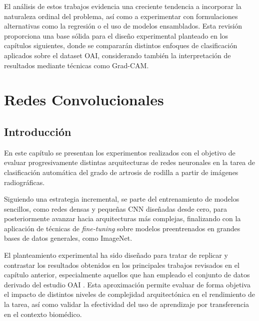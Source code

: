 \documentclass[11pt,spanish,listoffigures,listoftables]{tfgetsinf}
\begin{document}
El análisis de estos trabajos evidencia una creciente tendencia a incorporar la naturaleza ordinal del problema, así como a experimentar 
con formulaciones alternativas como la regresión o el uso de modelos ensamblados. Esta revisión proporciona una base sólida para el diseño 
experimental planteado en los capítulos siguientes, donde se compararán distintos enfoques de clasificación aplicados sobre el dataset OAI, 
considerando también la interpretación de resultados mediante técnicas como Grad-CAM.



\chapter{Redes Convolucionales}
\label{chap:experiments}


\section{Introducción} 
En este capítulo se presentan los experimentos realizados con el objetivo de evaluar progresivamente distintas 
arquitecturas de redes neuronales en la tarea de clasificación automática del grado de artrosis de rodilla a 
partir de imágenes radiográficas.

Siguiendo una estrategia incremental, se parte del entrenamiento de modelos sencillos, como redes densas y 
pequeñas CNN diseñadas desde cero, para posteriormente avanzar hacia arquitecturas más complejas, finalizando 
con la aplicación de técnicas de \textit{fine-tuning} sobre modelos preentrenados en grandes bases de datos 
generales, como ImageNet.

El planteamiento experimental ha sido diseñado para tratar de replicar y contrastar los resultados obtenidos 
en los principales trabajos revisados en el capítulo anterior, especialmente aquellos que han empleado el 
conjunto de datos derivado del estudio OAI \cite{chen2018knee}. Esta aproximación permite evaluar de forma 
objetiva el impacto de distintos niveles de complejidad arquitectónica en el rendimiento de la tarea, así 
como validar la efectividad del uso de aprendizaje por transferencia en el contexto biomédico.
\end{document}
